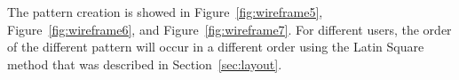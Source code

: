   The pattern creation is showed in Figure~\ref{fig:wireframe5}, Figure~\ref{fig:wireframe6}, and Figure~\ref{fig:wireframe7}. For different users, the order of the different pattern will occur in a different order using the Latin Square method that was described in Section~\ref{sec:layout}.

    \begin{figure}[H]
\end{figure}
